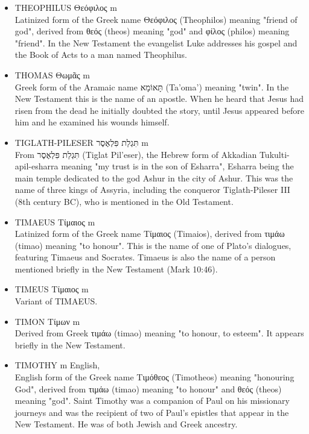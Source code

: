 \begin{itemize}
From Θαδδαῖος (Thaddaios), the Greek form of the Aramaic name Thaddai. It is possibly derived from a word meaning "heart", but it may in fact be an Aramaic form of a Greek name such as Θεόδωρος (see THEODORE). In the Gospel of Matthew, Thaddaeus is listed as one of the twelve apostles, though elsewhere in the New Testament his name is omitted and Jude's appears instead. It is likely that the two names refer to the same person.
\item THEOPHILUS Θεόφιλος m \\
Latinized form of the Greek name Θεόφιλος (Theophilos) meaning "friend of god", derived from θεός (theos) meaning "god" and φίλος (philos) meaning "friend". In the New Testament the evangelist Luke addresses his gospel and the Book of Acts to a man named Theophilus.
\item THOMAS Θωμᾶς m \\
Greek form of the Aramaic name תָּאוֹמָא (Ta'oma') meaning "twin". In the New Testament this is the name of an apostle. When he heard that Jesus had risen from the dead he initially doubted the story, until Jesus appeared before him and he examined his wounds himself. 
\item TIGLATH-PILESER תִּגְלַת פִּלְאֶסֶר m \\
From תִּגְלַת פִּלְאֶסֶר (Tiglat Pil'eser), the Hebrew form of Akkadian Tukulti-apil-esharra meaning "my trust is in the son of Esharra", Esharra being the main temple dedicated to the god Ashur in the city of Ashur. This was the name of three kings of Assyria, including the conqueror Tiglath-Pileser III (8th century BC), who is mentioned in the Old Testament.
\item TIMAEUS Τίμαιος m \\
Latinized form of the Greek name Τίμαιος (Timaios), derived from τιμάω (timao) meaning "to honour". This is the name of one of Plato's dialogues, featuring Timaeus and Socrates. Timaeus is also the name of a person mentioned briefly in the New Testament (Mark 10:46).
\item TIMEUS Τίμαιος m \\
Variant of TIMAEUS.
\item TIMON Τίμων m \\
Derived from Greek τιμάω (timao) meaning "to honour, to esteem". It appears briefly in the New Testament. 
\item TIMOTHY m English, \\
English form of the Greek name Τιμόθεος (Timotheos) meaning "honouring God", derived from τιμάω (timao) meaning "to honour" and θεός (theos) meaning "god". Saint Timothy was a companion of Paul on his missionary journeys and was the recipient of two of Paul's epistles that appear in the New Testament. He was of both Jewish and Greek ancestry. 

\end{itemize}
